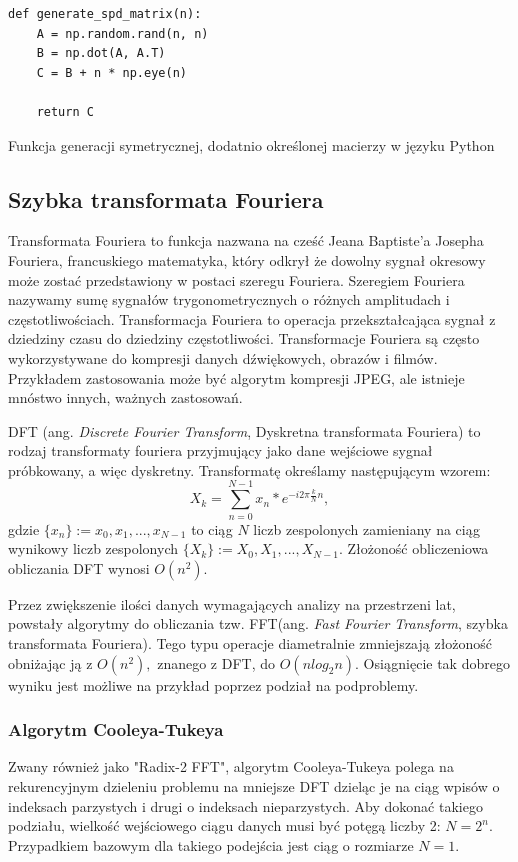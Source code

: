 \documentclass[a4paper,12pt]{book} %
\begin{document}
\begin{lstfloat}[H]
\lstset{language=Python}
\begin{lstlisting}[frame=single]
def generate_spd_matrix(n):
    A = np.random.rand(n, n)
    B = np.dot(A, A.T)
    C = B + n * np.eye(n)

    return C
\end{lstlisting}
\caption{Funkcja generacji symetrycznej, dodatnio określonej macierzy w języku Python}
\label{lst:gen_spd_matrix}
\end{lstfloat}

\subsection{Szybka transformata Fouriera}
Transformata Fouriera to funkcja nazwana na cześć Jeana Baptiste'a Josepha Fouriera, francuskiego matematyka, który odkrył że dowolny sygnał okresowy może zostać przedstawiony w postaci szeregu Fouriera. Szeregiem Fouriera nazywamy sumę sygnałów trygonometrycznych o różnych amplitudach i częstotliwościach. Transformacja Fouriera to operacja przekształcająca sygnał z dziedziny czasu do dziedziny częstotliwości. Transformacje Fouriera są często wykorzystywane do kompresji danych dźwiękowych, obrazów i filmów. Przykładem zastosowania może być algorytm kompresji JPEG, ale istnieje mnóstwo innych, ważnych zastosowań.

DFT (ang. \emph{Discrete Fourier Transform}, Dyskretna transformata Fouriera) to rodzaj transformaty fouriera przyjmujący jako dane wejściowe sygnał próbkowany, a więc dyskretny. Transformatę określamy następującym wzorem: $$ {X_k = \sum_{n=0}^{N-1}x_n*e^{-i2\pi \frac{k}{N}n}},$$gdzie $ \{x_n\} := x_0, x_1, ..., x_{N-1} $ to ciąg $N$ liczb zespolonych zamieniany na ciąg wynikowy liczb zespolonych $ \{ X_k\} := X_0, X_1, ..., X_{N-1} $. Złożoność obliczeniowa obliczania DFT wynosi $O(n^2).$

Przez zwiększenie ilości danych wymagających analizy na przestrzeni lat, powstały algorytmy do obliczania tzw. FFT(ang. \emph{Fast Fourier Transform}, szybka transformata Fouriera). Tego typu operacje diametralnie zmniejszają złożoność obniżając ją z $O(n^2),$ znanego z DFT, do $O(nlog_2n).$ Osiągnięcie tak dobrego wyniku jest możliwe na przykład poprzez podział na podproblemy.
\subsubsection{Algorytm Cooleya-Tukeya}
Zwany również jako "Radix-2 FFT", algorytm Cooleya-Tukeya polega na rekurencyjnym dzieleniu problemu na mniejsze DFT dzieląc je na ciąg wpisów o indeksach parzystych i drugi o indeksach nieparzystych.\cite{CooleyTukey} Aby dokonać takiego podziału, wielkość wejściowego ciągu danych musi być potęgą liczby 2: $N = 2^n.$ Przypadkiem bazowym dla takiego podejścia jest ciąg o rozmiarze $N = 1.$
\end{document}
